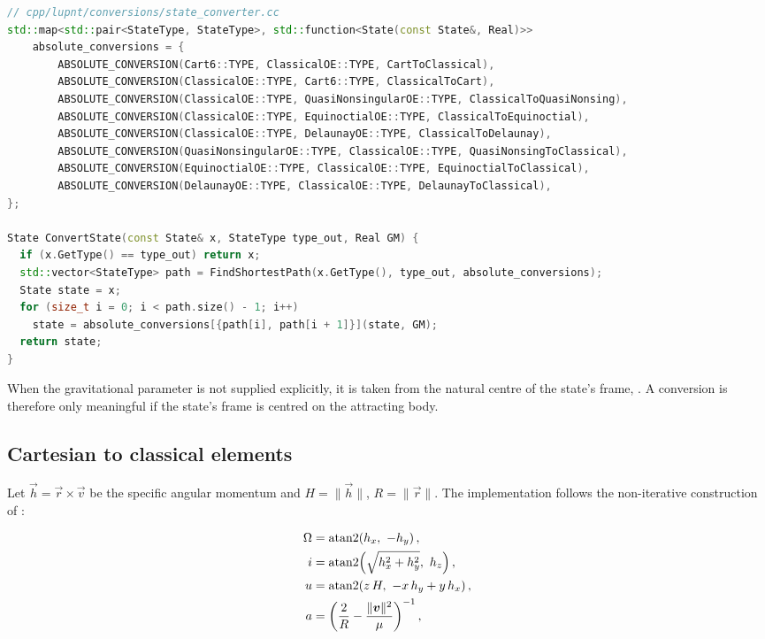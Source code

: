 \begin{lstlisting}[language=cpp, caption={The absolute conversion graph.}, label={lst:dyn-graph}]
// cpp/lupnt/conversions/state_converter.cc
std::map<std::pair<StateType, StateType>, std::function<State(const State&, Real)>>
    absolute_conversions = {
        ABSOLUTE_CONVERSION(Cart6::TYPE, ClassicalOE::TYPE, CartToClassical),
        ABSOLUTE_CONVERSION(ClassicalOE::TYPE, Cart6::TYPE, ClassicalToCart),
        ABSOLUTE_CONVERSION(ClassicalOE::TYPE, QuasiNonsingularOE::TYPE, ClassicalToQuasiNonsing),
        ABSOLUTE_CONVERSION(ClassicalOE::TYPE, EquinoctialOE::TYPE, ClassicalToEquinoctial),
        ABSOLUTE_CONVERSION(ClassicalOE::TYPE, DelaunayOE::TYPE, ClassicalToDelaunay),
        ABSOLUTE_CONVERSION(QuasiNonsingularOE::TYPE, ClassicalOE::TYPE, QuasiNonsingToClassical),
        ABSOLUTE_CONVERSION(EquinoctialOE::TYPE, ClassicalOE::TYPE, EquinoctialToClassical),
        ABSOLUTE_CONVERSION(DelaunayOE::TYPE, ClassicalOE::TYPE, DelaunayToClassical),
};

State ConvertState(const State& x, StateType type_out, Real GM) {
  if (x.GetType() == type_out) return x;
  std::vector<StateType> path = FindShortestPath(x.GetType(), type_out, absolute_conversions);
  State state = x;
  for (size_t i = 0; i < path.size() - 1; i++)
    state = absolute_conversions[{path[i], path[i + 1]}](state, GM);
  return state;
}
\end{lstlisting}

When the gravitational parameter is not supplied explicitly, it is taken from the
natural centre of the state's frame, .
A conversion is therefore only meaningful if the state's frame is centred on the
attracting body.

\subsection{Cartesian to classical elements}
\label{sec:dyn-cart2coe}

Let $\vec{h} = \vec{r}\times\vec{v}$ be the specific angular momentum and
$H=\lVert\vec{h}\rVert$, $R=\lVert\vec{r}\rVert$. The implementation follows the
non-iterative construction of \citet{montenbruck2000}:

\begin{align}
  \Omega &= \operatorname{atan2}\!\left(h_x,\ -h_y\right), \label{eq:dyn-coe-raan}\\
  i &= \operatorname{atan2}\!\left(\sqrt{h_x^2+h_y^2},\ h_z\right), \label{eq:dyn-coe-inc}\\
  u &= \operatorname{atan2}\!\left(z\,H,\ -x\,h_y + y\,h_x\right), \label{eq:dyn-coe-arglat}\\
  a &= \left(\frac{2}{R} - \frac{\lVert\bm{v}\rVert^2}{\mu}\right)^{-1}, \label{eq:dyn-coe-sma}
\end{align}

